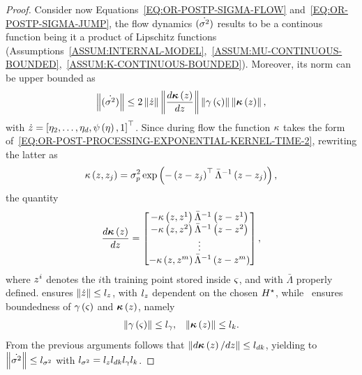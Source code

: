 \begin{proof}
   Consider now Equations~\eqref{EQ:OR-POSTP-SIGMA-FLOW} and~\eqref{EQ:OR-POSTP-SIGMA-JUMP}, the flow dynamics $\dot{\left( \sigma^2 \right)}$ results to be a continous function
   being it a product of Lipschitz functions (Assumptions~\ref{ASSUM:INTERNAL-MODEL},~\ref{ASSUM:MU-CONTINUOUS-BOUNDED},~\ref{ASSUM:K-CONTINUOUS-BOUNDED}).
   Moreover, its norm can be upper bounded as
   \begin{equation*}
      \left \lVert {\dot{\left(\sigma^2\right)}} \right \rVert \le 2 \left \lVert {\dot{z}} \right \rVert \left \lVert {\frac{d \boldsymbol{\kappa}\left(z\right)}{d z}} \right \rVert \left \lVert {\gamma \left(\varsigma\right)} \right \rVert \left \lVert {\boldsymbol{\kappa}\left(z\right)} \right \rVert,
   \end{equation*}
   with $\dot{z} = \left[ \eta_2, \dots, \eta_d, \psi \left( \eta \right), 1 \right]^{\top}$.
   Since during flow the function $\kappa$ takes the form of~\eqref{EQ:OR-POST-PROCESSING-EXPONENTIAL-KERNEL-TIME-2}, rewriting the latter as
   \begin{equation*}
      \kappa \left( z, z_j \right) = \sigma_p^2 \exp\left( -\left( z-z_j \right)^{\top} \bar{\Lambda}^{-1} \left( z-z_j \right)\right),
   \end{equation*}
   the quantity 
   \begin{equation*}
      \frac{d \boldsymbol{\kappa} \left( z \right)}{d z} =
      \begin{bmatrix}
		-\kappa \left( z, z^1 \right) \bar{\Lambda}^{-1} \left( z - z^1 \right) \\
		-\kappa \left( z, z^2 \right) \bar{\Lambda}^{-1} \left( z - z^2 \right) \\
		\vdots \\
		-\kappa \left( z, z^m \right) \bar{\Lambda}^{-1} \left( z - z^m \right)
      \end{bmatrix},
   \end{equation*}
   where $z^i$ denotes the $i$th training point stored inside $\varsigma$, and with $\bar{\Lambda}$ properly defined.
    ensures $\left \lVert {\dot{z}} \right \rVert \le l_{z}$, with $l_{z}$ dependent on the chosen $H^{\star}$,
   while~ ensures boundedness of $\gamma \left( \varsigma \right)$ and $\boldsymbol{\kappa} \left( z \right)$, namely
   \begin{equation*}
      \begin{matrix}
         \left \lVert {\gamma \left(\varsigma\right)} \right \rVert \le l_{\gamma}, &
         \left \lVert {\boldsymbol{\kappa}\left(z\right)} \right \rVert \le l_{k}
      \end{matrix}.
   \end{equation*}
   From the previous arguments follows that $\left \lVert {d \boldsymbol{\kappa}\left(z\right)/ d z} \right \rVert \le l_{dk}$, yielding to
   $\left \lVert {\dot{\sigma^2}} \right \rVert \le l_{\sigma^2}$ with $l_{\sigma^2} = l_{z}l_{dk}l_{\gamma}l_{k}$.

\end{proof}

